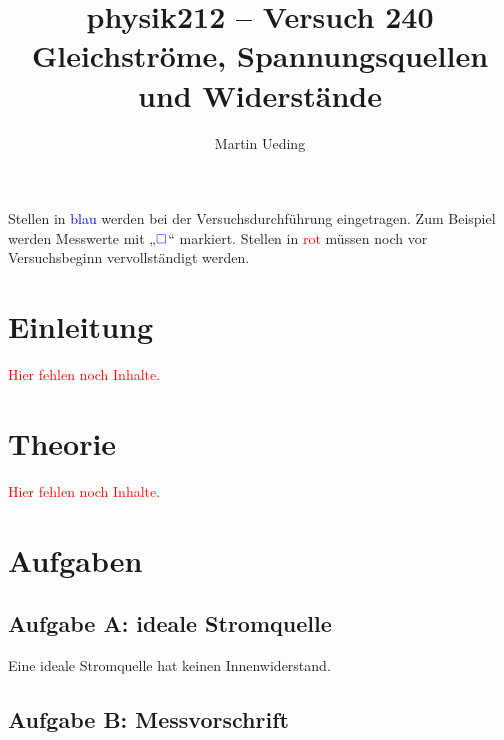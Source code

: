 \documentclass[11pt]{article}
\title{physik212 -- Versuch 240 \\ Gleichströme, Spannungsquellen und Widerstände}
\author{Martin Ueding}
\newcommand{\messwert}{\textcolor{blue}{\square}}
\newcommand{\fehlt}{\textcolor{red}{Hier fehlen noch Inhalte.}}
\begin{document}
\maketitle

\tableofcontents

\vfill

Stellen in \textcolor{blue}{blau} werden bei der Versuchsdurchführung eingetragen. Zum Beispiel werden Messwerte mit „$\messwert$“ markiert. Stellen in \textcolor{red}{rot} müssen noch vor Versuchsbeginn vervollständigt werden.

\newpage


\section{Einleitung}

\fehlt


\section{Theorie}

\fehlt


\section{Aufgaben}

\subsection{Aufgabe A: ideale Stromquelle}

Eine ideale Stromquelle hat keinen Innenwiderstand.

\subsection{Aufgabe B: Messvorschrift}
\end{document}
